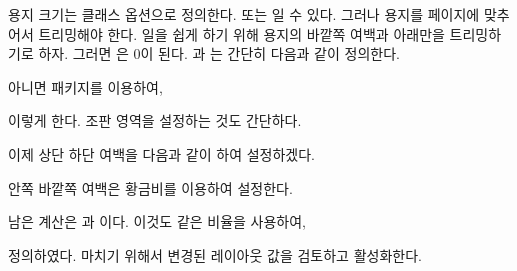 \begin{lcode}
\settrimmedsize{11in}{210mm}{*}
\end{lcode}
용지 크기는 클래스 옵션으로 정의한다.  또는 일 수 있다. 그러나 용지를 페이지에 맞추어서 트리밍해야 한다.
일을 쉽게 하기 위해 용지의 바깥쪽 여백과 아래만을 트리밍하기로 하자.
그러면 \lnc{\trimtop}은 0이 된다. \lnc{\trimtop}과 \lnc{\trimedge}는
간단히 다음과 같이 정의한다.
\begin{lcode}
\setlength{\trimtop}{0pt} 
\setlength{\trimedge}{\stockwidth}
\addtolength{\trimedge}{-\paperwidth}
\end{lcode}
아니면  패키지를 이용하여,
\begin{lcode}
\settrims{0pt}{\stockwidth - \paperwidth}
\end{lcode}
이렇게 한다. 조판 영역을 설정하는 것도 간단하다.
\begin{lcode}
\end{lcode}
이제 상단 하단 여백을 다음과 같이 하여 설정하겠다.
\begin{lcode}
\setulmargins{50pt}{*}{*}
\end{lcode}
안쪽 바깥쪽 여백은 황금비를 이용하여 설정한다.
\begin{lcode}
\end{lcode}
남은 계산은 \lnc{\headmargin}과 \lnc{\headsep}이다.
이것도 같은 비율을 사용하여,
\begin{lcode}
\end{lcode}
정의하였다.
마치기 위해서 변경된 레이아웃 값을 검토하고 활성화한다.
\begin{lcode}
\checkandfixthelayout
\end{lcode}


